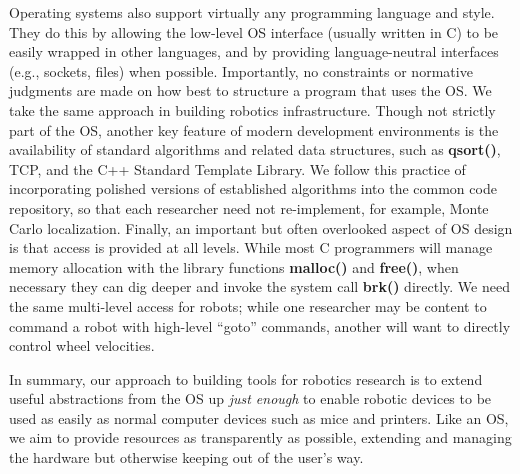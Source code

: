 Operating systems also support virtually any programming language
and style.  They do this by allowing the low-level OS interface
(usually written in C) to be easily wrapped in other languages, and
by providing language-neutral interfaces (e.g., sockets, files) when
possible.  Importantly, no constraints or normative judgments are made
on how best to structure a program that uses the OS\@.  We take the same
approach in building robotics infrastructure.  Though not strictly part
of the OS, another key feature of modern development environments is the
availability of standard algorithms and related data structures, such
as {\bf qsort()}, TCP, and the C++ Standard Template Library.  We follow
this practice of incorporating polished versions of established algorithms
into the common code repository, so that each researcher need not
re-implement, for example, Monte Carlo localization.  Finally, an important
but often overlooked aspect of OS design is that access is provided at all
levels.  While most C programmers will manage memory allocation with the
library functions {\bf malloc()} and {\bf free()}, when necessary they can
dig deeper and invoke the system call {\bf brk()} directly.  We need
the same multi-level access for robots; while one researcher may be content
to command a robot with high-level ``goto'' commands, another will want to
directly control wheel velocities.

In summary, our approach to building tools for robotics research is to
extend useful abstractions from the OS up {\it just enough} to enable
robotic devices to be used as easily as normal computer devices such
as mice and printers. Like an OS, we aim to provide resources as
transparently as possible, extending and managing the hardware but
otherwise keeping out of the user's way.


